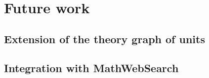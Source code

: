 \section{Future work}
\subsection{Extension of the theory graph of units}

\subsection{Integration with MathWebSearch}




